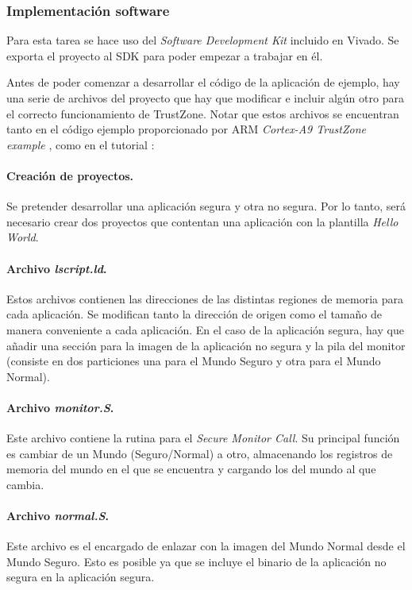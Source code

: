 \subsubsection{Implementación software}
Para esta tarea se hace uso del \textit{Software Development Kit} incluido en Vivado. Se exporta el proyecto al SDK para poder empezar a trabajar en él. \newline

Antes de poder comenzar a desarrollar el código de la aplicación de ejemplo, hay una serie de archivos del proyecto que hay que modificar e incluir algún otro para el correcto funcionamiento de TrustZone. Notar que estos archivos se encuentran tanto en el código ejemplo proporcionado por ARM \textit{Cortex-A9 TrustZone example} \cite{armexample}, como en el tutorial \cite{vivadotutorial}: \newline

\paragraph{Creación de proyectos.} Se pretender desarrollar una aplicación segura y otra no segura. Por lo tanto, será necesario crear dos proyectos que contentan una aplicación con la plantilla \textit{Hello World}.

\paragraph{Archivo \textit{lscript.ld}.} Estos archivos contienen las direcciones de las distintas regiones de memoria para cada aplicación. Se modifican tanto la dirección de origen como el tamaño de manera conveniente a cada aplicación. En el caso de la aplicación segura, hay que añadir una sección para la imagen de la aplicación no segura y la pila del monitor (consiste en dos particiones una para el Mundo Seguro y otra para el Mundo Normal).

\paragraph{Archivo \textit{monitor.S}.} Este archivo contiene la rutina para el \textit{Secure Monitor Call}. Su principal función es cambiar de un Mundo (Seguro/Normal) a otro, almacenando los registros de memoria del mundo en el que se encuentra y cargando los del mundo al que cambia.

\paragraph{Archivo \textit{normal.S}.} Este archivo es el encargado de enlazar con la imagen del Mundo Normal desde el Mundo Seguro. Esto es posible ya que se incluye el binario de la aplicación no segura en la aplicación segura.


